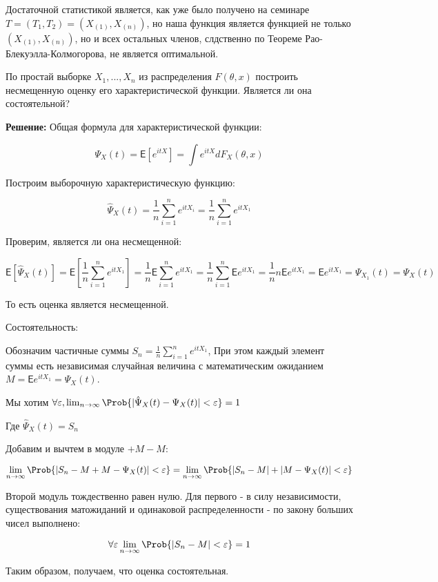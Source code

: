 \documentclass[12pt]{article}
\theoremstyle{definiton}
\theoremstyle{definition}
\theoremstyle{definition}
\let\epsilon\varepsilon
\newcommand{\Expect}{\mathsf{E}}
\newcounter{problem}
\newcounter{subproblem}
\def\prp{\medskip\noindent\stepcounter{problem}{\bf Задача \theproblem .  }\setcounter{subproblem}{0} }
\begin{document}
Достаточной статистикой является, как уже было получено на семинаре $T = (T_1, T_2) = (X_{(1)}, X_{(n)})$, но наша функция является функцией не только $(X_{(1)}, X_{(n)})$, но и всех остальных членов, слдственно по Теореме Рао-Блекуэлла-Колмогорова, не является оптимальной.

\prp  По простай выборке $X_1,...,X_n$ из распределения $F(\theta, x)$ построить несмещенную оценку его характеристической функции. Является ли она состоятельной?

\textbf{Решение: } Общая формула для характеристической функции:

$$\Psi_X(t) = \Expect [ e^{itX} ] = \int e^{itX} d F_X(\theta,x)$$

Построим выборочную характеристическую функцию:

$$\hat\Psi_X(t) = \frac1n \sum\limits_{i=1}^{n} e^{itX_i} = \frac1n \sum\limits_{i=1}^{n} e^{itX_1}$$

Проверим, является ли она несмещенной:

$$\Expect [ \hat\Psi_X(t) ] = \Expect [ \frac1n \sum\limits_{i=1}^{n} e^{itX_1} ] = \frac1n \Expect \sum\limits_{i=1}^{n} e^{itX_1} = \frac1n \sum\limits_{i=1}^{n} \Expect e^{itX_1} = \frac1n n \Expect e^{itX_1} = \Expect e^{itX_1} = \Psi_{X_1}(t) = \Psi_{X}(t)$$

То есть оценка является несмещенной.

Состоятельность:

Обозначим частичные суммы $S_n = \frac1n \sum\limits_{i=1}^{n} e^{itX_1}$, При этом каждый элемент суммы есть независимая случайная величина с математическим ожиданием $M = \Expect e^{itX_1} = \Psi_{X}(t)$. 

Мы хотим $\forall \epsilon, \lim_{n \to \infty} \Prob \{ |\hat\Psi_X(t) - \Psi_X(t)| < \epsilon \} = 1$

Где $\hat\Psi_X(t) = S_n$

Добавим и вычтем в модуле $+M -M$:

 $$\lim_{n \to \infty} \Prob \{ |S_n - M + M - \Psi_X(t)| < \epsilon \} = \lim_{n \to \infty} \Prob \{ |S_n - M | + |M  - \Psi_X(t)| < \epsilon \}$$
 
Второй модуль тождественно равен нулю. Для первого - в силу независимости, существования матожиданий и одинаковой распределенности - по закону больших чисел выполнено:

$$\forall \epsilon \lim_{n \to \infty} \Prob \{ |S_n - M | < \epsilon \} = 1$$

Таким образом, получаем, что оценка состоятельная.
\end{document}
